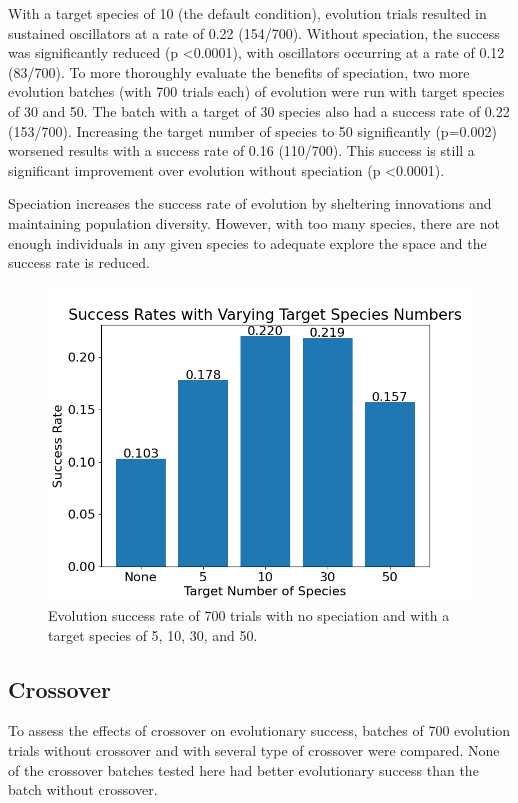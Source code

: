 \documentclass[12pt]{report}
\begin{document}
With a target species of 10 (the default condition), evolution trials resulted in sustained oscillators at a rate of 0.22 (154/700). Without speciation, the success was significantly reduced (p \textless 0.0001), with oscillators occurring at a rate of 0.12 (83/700). To more thoroughly evaluate the benefits of speciation, two more evolution batches (with 700 trials each) of evolution were run with target species of 30 and 50. The batch with a target of 30 species also had a success rate of 0.22 (153/700). Increasing the target number of species to 50 significantly (p=0.002) worsened results with a success rate of 0.16 (110/700). This success is still a significant improvement over evolution without speciation (p \textless 0.0001).

Speciation increases the success rate of evolution by sheltering innovations and maintaining population diversity. However, with too many species, there are not enough individuals in any given species to adequate explore the space and the success rate is reduced.

 
\begin{figure}
	\centering
    \includegraphics[width=15cm]{images/species_success_rate.png}
    \caption[Evolutionary success rate with varying target species numbers]{Evolution success rate of 700 trials with no speciation and with a target species of 5, 10, 30, and 50.}
    \label{fig:species_success_rate}
\end{figure}

\subsection{Crossover}
To assess the effects of crossover on evolutionary success, batches of 700 evolution trials without crossover and with several type of crossover were compared. None of the crossover batches tested here had better evolutionary success than the batch without crossover. 
\end{document}
